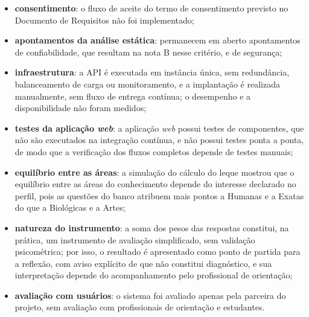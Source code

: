 \begin{itemize}
  \item \textbf{consentimento}: o fluxo de aceite do termo de consentimento previsto no Documento de Requisitos não foi implementado;
  \item \textbf{apontamentos da análise estática}: permanecem em aberto apontamentos de confiabilidade, que resultam na nota B nesse critério, e de segurança;
  \item \textbf{infraestrutura}: a API é executada em instância única, sem redundância, balanceamento de carga ou monitoramento, e a implantação é realizada manualmente, sem fluxo de entrega contínua; o desempenho e a disponibilidade não foram medidos;
  \item \textbf{testes da aplicação \textit{web}}: a aplicação \textit{web} possui testes de componentes, que não são executados na integração contínua, e não possui testes ponta a ponta, de modo que a verificação dos fluxos completos depende de testes manuais;
  \item \textbf{equilíbrio entre as áreas}: a simulação do cálculo do leque mostrou que o equilíbrio entre as áreas do conhecimento depende do interesse declarado no perfil, pois as questões do banco atribuem mais pontos a Humanas e a Exatas do que a Biológicas e a Artes;
  \item \textbf{natureza do instrumento}: a soma dos pesos das respostas constitui, na prática, um instrumento de avaliação simplificado, sem validação psicométrica; por isso, o resultado é apresentado como ponto de partida para a reflexão, com aviso explícito de que não constitui diagnóstico, e sua interpretação depende do acompanhamento pelo profissional de orientação;
  \item \textbf{avaliação com usuários}: o sistema foi avaliado apenas pela parceira do projeto, sem avaliação com profissionais de orientação e estudantes.
\end{itemize}
